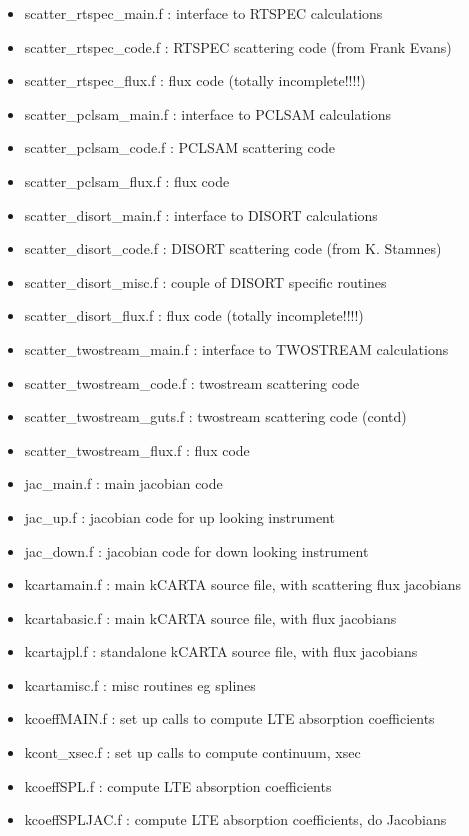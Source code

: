 \documentclass[12pt]{article}
\newcommand{\kc}{\textsf{kCARTA}\xspace}
\begin{document}
\begin{itemize}
\item {\sf scatter\_rtspec\_main.f} : interface to RTSPEC calculations
\item {\sf scatter\_rtspec\_code.f} : RTSPEC scattering code (from Frank Evans)
\item {\sf scatter\_rtspec\_flux.f} : flux code (totally incomplete!!!!)

\item {\sf scatter\_pclsam\_main.f} : interface to PCLSAM calculations
\item {\sf scatter\_pclsam\_code.f} : PCLSAM scattering code 
\item {\sf scatter\_pclsam\_flux.f} : flux code

\item {\sf scatter\_disort\_main.f} : interface to DISORT calculations
\item {\sf scatter\_disort\_code.f} : DISORT scattering code (from K. Stamnes)
\item {\sf scatter\_disort\_misc.f} : couple of DISORT specific routines
\item {\sf scatter\_disort\_flux.f} : flux code (totally incomplete!!!!)

\item {\sf scatter\_twostream\_main.f} : interface to TWOSTREAM calculations
\item {\sf scatter\_twostream\_code.f} : twostream scattering code 
\item {\sf scatter\_twostream\_guts.f} : twostream scattering code (contd)
\item {\sf scatter\_twostream\_flux.f} : flux code 

\item {\sf jac\_main.f} : main jacobian code
\item {\sf jac\_up.f} : jacobian code for up looking instrument
\item {\sf jac\_down.f} : jacobian code for down looking instrument

\item {\sf kcartamain.f} : main \kc source file, with scattering flux jacobians
\item {\sf kcartabasic.f} : main \kc source file, with flux jacobians
\item {\sf kcartajpl.f} : standalone \kc source file, with flux jacobians
\item {\sf kcartamisc.f} : misc routines eg splines

\item {\sf kcoeffMAIN.f} : set up calls to compute LTE absorption coefficients
\item {\sf kcont\_xsec.f} : set up calls to compute continuum, xsec
\item {\sf kcoeffSPL.f}  : compute LTE absorption coefficients
\item {\sf kcoeffSPLJAC.f}  : compute LTE absorption coefficients, do Jacobians


\end{itemize}
\end{document}
